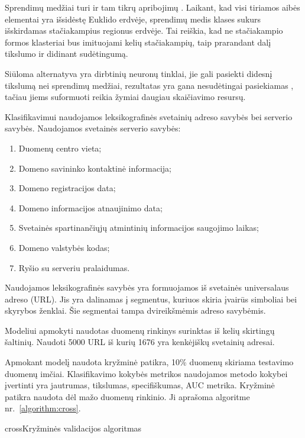 Sprendimų medžiai turi ir tam tikrų apribojimų \cite{c45}. Laikant, kad visi tiriamos aibės elementai yra išsidėstę Euklido erdvėje, sprendimų medis klases sukurs išskirdamas stačiakampius regionus erdvėje. Tai reiškia, kad ne stačiakampio formos klasteriai bus imituojami kelių stačiakampių, taip prarandant dalį tikslumo ir didinant sudėtingumą.

Siūloma alternatyva \cite{c45} yra dirbtinių neuronų tinklai, jie gali pasiekti didesnį tikslumą nei sprendimų medžiai, rezultatas yra gana nesudėtingai pasiekiamas \cite{c45}, tačiau jiems suformuoti reikia žymiai daugiau skaičiavimo resursų.

Klasifikavimui naudojamos leksikografinės svetainių adreso savybės bei serverio savybės. Naudojamos svetainės serverio savybės:
\begin{enumerate}[label=\arabic*.]
    \item Duomenų centro vieta;
    \item Domeno savininko kontaktinė informacija;
    \item Domeno registracijos data;
    \item Domeno informacijos atnaujinimo data;
    \item Svetainės spartinančiųjų atmintinių informacijos saugojimo laikas;
    \item Domeno valstybės kodas;
    \item Ryšio su serveriu pralaidumas.
\end{enumerate}

Naudojamos leksikografinės savybės yra formuojamos iš svetainės universalaus adreso (URL). Jis yra dalinamas į segmentus, kuriuos skiria įvairūs simboliai bei skyrybos ženklai. Šie segmentai tampa dvireikšmėmis adreso savybėmis.

Modeliui apmokyti naudotas duomenų rinkinys surinktas iš kelių skirtingų šaltinių. Naudoti 5000 URL iš kurių 1676 yra kenkėjiškų svetainių adresai.

Apmokant modelį naudota kryžminė patikra, 10\% duomenų skiriama testavimo duomenų imčiai. Klasifikavimo kokybės metrikos naudojamos metodo kokybei įvertinti yra jautrumas, tikslumas, specifiškumas, AUC metrika. Kryžminė patikra naudota dėl mažo duomenų rinkinio. Ji aprašoma algoritme nr.~\vref{algorithm:cross}.

\begin{ktualgo}{cross}{Kryžminės validacijos algoritmas}
    \EndFor{}
\end{ktualgo}

